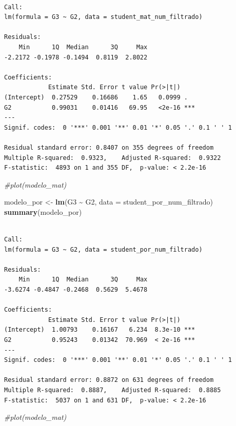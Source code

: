\documentclass[
]{article}
\newenvironment{Shaded}{\begin{snugshade}}{\end{snugshade}}
\newcommand{\AttributeTok}[1]{\textcolor[rgb]{0.13,0.29,0.53}{#1}}
\newcommand{\CommentTok}[1]{\textcolor[rgb]{0.56,0.35,0.01}{\textit{#1}}}
\newcommand{\FunctionTok}[1]{\textcolor[rgb]{0.13,0.29,0.53}{\textbf{#1}}}
\newcommand{\NormalTok}[1]{#1}
\newcommand{\OtherTok}[1]{\textcolor[rgb]{0.56,0.35,0.01}{#1}}
\newcommand{\SpecialCharTok}[1]{\textcolor[rgb]{0.81,0.36,0.00}{\textbf{#1}}}
\begin{document}
\begin{verbatim}

Call:
lm(formula = G3 ~ G2, data = student_mat_num_filtrado)

Residuals:
    Min      1Q  Median      3Q     Max 
-2.2172 -0.1978 -0.1494  0.8119  2.8022 

Coefficients:
            Estimate Std. Error t value Pr(>|t|)    
(Intercept)  0.27529    0.16686    1.65   0.0999 .  
G2           0.99031    0.01416   69.95   <2e-16 ***
---
Signif. codes:  0 '***' 0.001 '**' 0.01 '*' 0.05 '.' 0.1 ' ' 1

Residual standard error: 0.8407 on 355 degrees of freedom
Multiple R-squared:  0.9323,    Adjusted R-squared:  0.9322 
F-statistic:  4893 on 1 and 355 DF,  p-value: < 2.2e-16
\end{verbatim}

\begin{Shaded}
\begin{Highlighting}[]
\CommentTok{\#plot(modelo\_mat)}

\NormalTok{modelo\_por }\OtherTok{\textless{}{-}} \FunctionTok{lm}\NormalTok{(G3 }\SpecialCharTok{\textasciitilde{}}\NormalTok{ G2, }\AttributeTok{data =}\NormalTok{ student\_por\_num\_filtrado)}
\FunctionTok{summary}\NormalTok{(modelo\_por)}
\end{Highlighting}
\end{Shaded}

\begin{verbatim}

Call:
lm(formula = G3 ~ G2, data = student_por_num_filtrado)

Residuals:
    Min      1Q  Median      3Q     Max 
-3.6274 -0.4847 -0.2468  0.5629  5.4678 

Coefficients:
            Estimate Std. Error t value Pr(>|t|)    
(Intercept)  1.00793    0.16167   6.234  8.3e-10 ***
G2           0.95243    0.01342  70.969  < 2e-16 ***
---
Signif. codes:  0 '***' 0.001 '**' 0.01 '*' 0.05 '.' 0.1 ' ' 1

Residual standard error: 0.8872 on 631 degrees of freedom
Multiple R-squared:  0.8887,    Adjusted R-squared:  0.8885 
F-statistic:  5037 on 1 and 631 DF,  p-value: < 2.2e-16
\end{verbatim}

\begin{Shaded}
\begin{Highlighting}[]
\CommentTok{\#plot(modelo\_mat)}
\end{Highlighting}
\end{Shaded}
\end{document}
